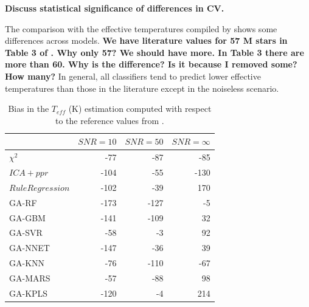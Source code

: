 {\bf Discuss statistical significance of differences in CV.}


The comparison with the effective temperatures compiled by
\cite{cesetti} shows some differences across models. {\bf We have
  literature values for 57 M stars in Table 3 of \cite{cesetti}. Why
  only 57? We should have more. In Table 3 there are more than 60. Why
  is the difference? Is it because I removed some? How many?} In
general, all classifiers tend to predict lower effective temperatures
than those in the literature except in the noiseless scenario.

\begin{table}\centering
{}
\begin{tabular}{@{}lrrr@{}}\toprule
& {$SNR = 10$} & {$SNR = 50$} & {$SNR = \infty$}\\ \midrule
$\chi^2 $            &  -77 &  -87  & -85 \\
$ICA+ppr$            & -104 & -55   & -130 \\
$Rule Regression$    & -102 &  -39  & 170 \\
GA-RF                & -173 & -127  &  -5 \\
GA-GBM               & -141 & -109  &  32 \\
GA-SVR               &  -58  &  -3  &  92 \\
GA-NNET              & -147 &  -36  &  39 \\
GA-KNN               &  -76  &-110  & -67 \\
GA-MARS              &  -57  & -88  &  98 \\
GA-KPLS              & -120 &   -4  & 214 \\
\bottomrule
\end{tabular}
\caption {Bias in the $T_{eff}$ (K) estimation computed with respect
  to the reference values from \cite{cesetti}.}
\label{tab:model_Tbias} 
\end{table}

